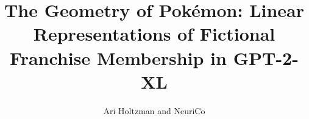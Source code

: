 \documentclass{article}
\title{The Geometry of Pok\'{e}mon: Linear Representations of Fictional Franchise Membership in GPT-2-XL}
\author{Ari Holtzman and NeuriCo}
\begin{document}
\maketitle

\begin{abstract}

\end{abstract}










\end{document}
